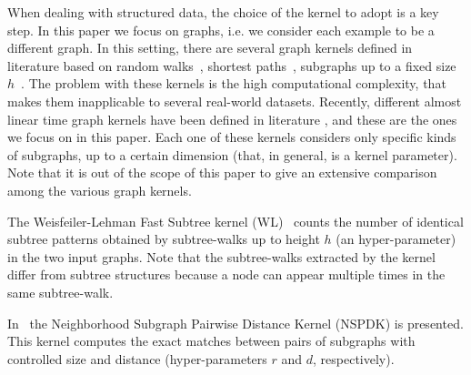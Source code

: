 \documentclass{esannV2}
\newcommand{\1}{{\bf 1}}
\begin{document}
When dealing with structured data, the choice of the kernel to adopt is a key step.
%
In this paper we focus on graphs, i.e. we consider each example to be a different graph.
In this setting, there are several graph kernels defined in literature based on random walks~\cite{Kashima03marginalizedkernels,Mahe2004},
shortest paths~\cite{Kriegel05shortestpath},
 subgraphs up to a fixed size $h$~\cite{Shervashidze2009}.
 The problem with these kernels is the high computational complexity, that makes them inapplicable to several real-world datasets.
Recently, different almost linear time graph kernels have been defined in literature \cite{Heinonen2009,Costa2010,Shervashidze2011,DaSanMartino2016}, and these are the ones we focus on in this paper.
Each one of these kernels considers only specific kinds of subgraphs, up to a certain dimension (that, in general, is a kernel parameter).
Note that it is out of the scope of this paper to give an extensive comparison among the various graph kernels. 

The Weisfeiler-Lehman Fast Subtree kernel (WL)~\cite{Shervashidze2011}  counts the number of identical subtree patterns obtained by subtree-walks up to height $h$ (an hyper-parameter) in the two input graphs. %
Note that the subtree-walks extracted by the kernel differ from  subtree structures because a node can appear multiple times in the same subtree-walk.

In~\cite{Costa2010} the Neighborhood Subgraph Pairwise Distance Kernel (NSPDK) is presented. This kernel computes the exact matches between pairs of subgraphs with controlled size and distance (hyper-parameters $r$ and $d$, respectively). 
\end{document}
